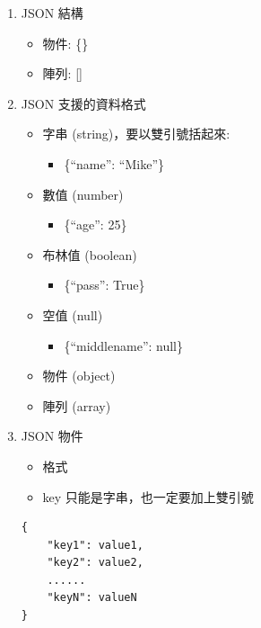 \documentclass[a4paper,12pt]{article}
\begin{document}
\begin{enumerate}
\begin{itemize}
\item 許多程式都支援函式庫讀取或修改 JSON 資料\\
\item NoSQL Database\\
\end{itemize}
\item JSON 結構
\label{sec:org02697f5}
\begin{itemize}
\item 物件: \{\}\\
\item 陣列: []\\
\end{itemize}
\item JSON 支援的資料格式
\label{sec:org0850568}
\begin{itemize}
\item 字串 (string)，要以雙引號括起來:\\
\begin{itemize}
\item \{``name'': ``Mike''\}\\
\end{itemize}
\item 數值 (number)\\
\begin{itemize}
\item \{``age'': 25\}\\
\end{itemize}
\item 布林值 (boolean)\\
\begin{itemize}
\item \{``pass'': True\}\\
\end{itemize}
\item 空值 (null)\\
\begin{itemize}
\item \{``middlename'': null\}\\
\end{itemize}
\item 物件 (object)\\
\item 陣列 (array)\\
\end{itemize}
\item JSON 物件
\label{sec:orgee92ec9}
\begin{itemize}
\item 格式\\
\item key 只能是字串，也一定要加上雙引號\\
\end{itemize}
\lstset{breaklines=true,language=Python,label= ,caption= ,captionpos=b,firstnumber=1,numbers=left}
\begin{lstlisting}
{
    "key1": value1,
    "key2": value2,
    ......
    "keyN": valueN
}
\end{lstlisting}


\end{enumerate}
\end{document}

